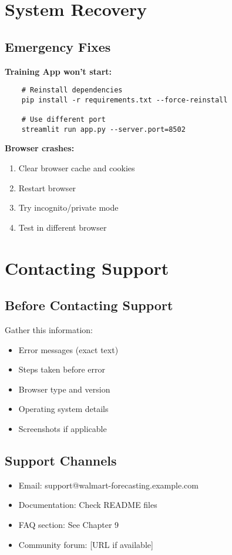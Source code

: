 \section{System Recovery}

\subsection{Emergency Fixes}

\textbf{Training App won't start:}
\begin{verbatim}
	# Reinstall dependencies
	pip install -r requirements.txt --force-reinstall
	
	# Use different port
	streamlit run app.py --server.port=8502
\end{verbatim}

\textbf{Browser crashes:}
\begin{enumerate}
	\item Clear browser cache and cookies
	\item Restart browser
	\item Try incognito/private mode
	\item Test in different browser
\end{enumerate}

\section{Contacting Support}

\subsection{Before Contacting Support}

Gather this information:
\begin{itemize}
	\item Error messages (exact text)
	\item Steps taken before error
	\item Browser type and version
	\item Operating system details
	\item Screenshots if applicable
\end{itemize}

\subsection{Support Channels}

\begin{itemize}
	\item Email: support@walmart-forecasting.example.com
	\item Documentation: Check README files
	\item FAQ section: See Chapter 9
	\item Community forum: [URL if available]
\end{itemize}